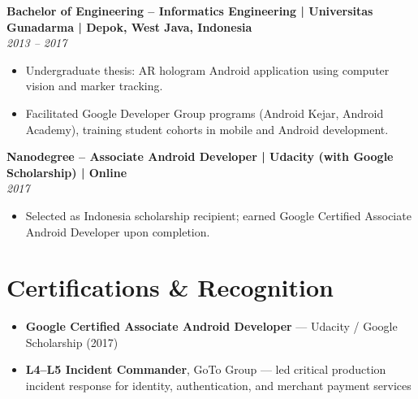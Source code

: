 \documentclass[10pt]{article}
\begin{document}
\textbf{Bachelor of Engineering -- Informatics Engineering | Universitas Gunadarma | Depok, West Java, Indonesia}\\
\textit{2013 -- 2017}
\begin{itemize}
\item Undergraduate thesis: AR hologram Android application using computer vision and marker tracking.
\item Facilitated Google Developer Group programs (Android Kejar, Android Academy), training student cohorts in mobile and Android development.
\end{itemize}

\smallskip
\textbf{Nanodegree -- Associate Android Developer | Udacity (with Google Scholarship) | Online}\\
\textit{2017}
\begin{itemize}
\item Selected as Indonesia scholarship recipient; earned Google Certified Associate Android Developer upon completion.
\end{itemize}

\section*{Certifications \& Recognition}
\begin{itemize}
\item \textbf{Google Certified Associate Android Developer} --- Udacity / Google Scholarship (2017)
\item \textbf{L4--L5 Incident Commander}, GoTo Group --- led critical production incident response for identity, authentication, and merchant payment services
\end{itemize}
\end{document}
